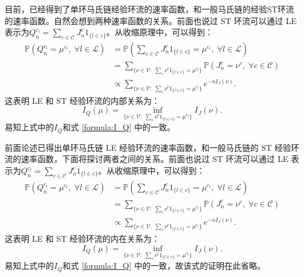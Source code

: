 目前，已经得到了单环马氏链经验环流的速率函数，和一般马氏链的经验ST环流的速率函数。自然会想到两种速率函数的关系。前面也说过 ST 环流可以通过 LE 表示为$Q_n^{c_l} = \sum_{c\in\mathcal{C}}J^c_n1_{\{l\in c\}}$。从收缩原理中，可以得到：
\begin{align*}
	\mathbb{P}\left(Q_n^{c_l}=\mu^{c_l},\;\forall l\in\mathcal{L}\right)
	&= \mathbb{P}\left(\sum_{c\in\mathcal{C}}J^c_n1_{\{l\in c\}}=\mu^{c_l},\;\forall l\in\mathcal{L}\right)\\
	&= \sum_{\{\nu\in\mathcal{V}:\;\sum_c\nu^c1_{\{l\in c\}}=\mu^{c_l}\}}
	\mathbb{P}\left(J^c_n=\nu^c,\;\forall c\in\mathcal{C}\right)\\
	&\propto \sum_{\{\nu\in\mathcal{V}:\;\sum_c\nu^c1_{\{l\in c\}}=\mu^{c_l}\}}e^{-nI_J(\nu)}.
\end{align*}
这表明 LE 和 ST 经验环流的内部关系为：
\begin{equation*}
	I_Q(\mu) = \inf_{\{\nu\in\mathcal{V}:\;\sum_c\nu^c1_{\{l\in c\}}=\mu^{c_l}\}}I_J(\nu).
\end{equation*}
易知上式中的$I_Q$和式 \eqref{formula:I_Q} 中的一致。

前面论述已得出单环马氏链 LE 经验环流的速率函数，和一般马氏链的 ST 经验环流的速率函数，下面将探讨两者之间的关系。前面也说过 ST 环流可以通过 LE 表示为$Q_n^{c_l} = \sum_{c\in\mathcal{C}}J^c_n1_{\{l\in c\}}$。从收缩原理中，可以得到：
\begin{align*}
	\mathbb{P}\left(Q_n^{c_l}=\mu^{c_l},\;\forall l\in\mathcal{L}\right)
	&= \mathbb{P}\left(\sum_{c\in\mathcal{C}}J^c_n1_{\{l\in c\}}=\mu^{c_l},\;\forall l\in\mathcal{L}\right)\\
	&= \sum_{\{\nu\in\mathcal{V}:\;\sum_c\nu^c1_{\{l\in c\}}=\mu^{c_l}\}}
	\mathbb{P}\left(J^c_n=\nu^c,\;\forall c\in\mathcal{C}\right)\\
	&\propto \sum_{\{\nu\in\mathcal{V}:\;\sum_c\nu^c1_{\{l\in c\}}=\mu^{c_l}\}}e^{-nI_J(\nu)}.
\end{align*}
这表明 LE 和 ST 经验环流的内在关系为：
\begin{equation*}
	I_Q(\mu) = \inf_{\{\nu\in\mathcal{V}:\;\sum_c\nu^c1_{\{l\in c\}}=\mu^{c_l}\}}I_J(\nu).
\end{equation*}
易知上式中的$I_Q$和式 \eqref{formula:I_Q} 中的一致，故该式的证明在此省略。


